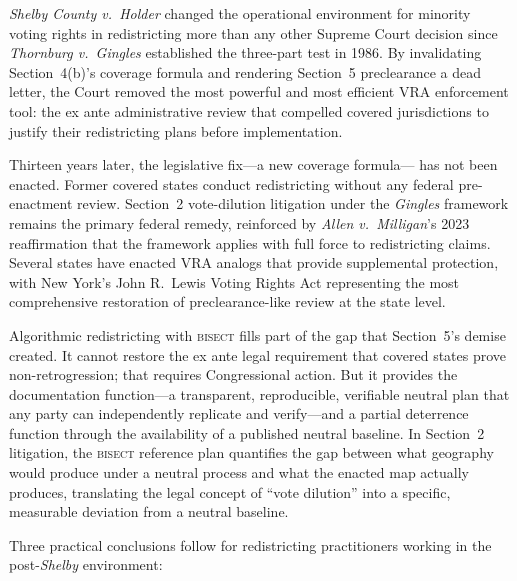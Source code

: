 \label{sec:conclusion}

\textit{Shelby County v.\ Holder} changed the operational environment
for minority voting rights in redistricting more than any other Supreme
Court decision since \textit{Thornburg v.\ Gingles} established the
three-part test in 1986. By invalidating Section~4(b)'s coverage formula
and rendering Section~5 preclearance a dead letter, the Court removed
the most powerful and most efficient VRA enforcement tool: the ex ante
administrative review that compelled covered jurisdictions to justify
their redistricting plans before implementation.

Thirteen years later, the legislative fix---a new coverage formula---
has not been enacted. Former covered states conduct redistricting
without any federal pre-enactment review. Section~2 vote-dilution
litigation under the \textit{Gingles} framework remains the primary
federal remedy, reinforced by \textit{Allen v.\ Milligan}'s 2023
reaffirmation that the framework applies with full force to redistricting
claims. Several states have enacted VRA analogs that provide supplemental
protection, with New York's John R.\ Lewis Voting Rights Act representing
the most comprehensive restoration of preclearance-like review at the
state level.

Algorithmic redistricting with \textsc{bisect} fills part of the gap
that Section~5's demise created. It cannot restore the ex ante legal
requirement that covered states prove non-retrogression; that requires
Congressional action. But it provides the documentation function---a
transparent, reproducible, verifiable neutral plan that any party can
independently replicate and verify---and a partial deterrence function
through the availability of a published neutral baseline. In Section~2
litigation, the \textsc{bisect} reference plan quantifies the gap between
what geography would produce under a neutral process and what the enacted
map actually produces, translating the legal concept of ``vote dilution''
into a specific, measurable deviation from a neutral baseline.

Three practical conclusions follow for redistricting practitioners
working in the post-\textit{Shelby} environment:

